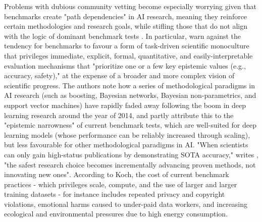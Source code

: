 Problems with dubious community vetting become especially worrying given that benchmarks create "path dependencies" in AI research, meaning they reinforce certain methodologies and research goals, while stifling those that do not align with the logic of dominant benchmark tests \cite{blili-hamelin2023}. %
In particular, \citet[p.~3]{koch2024} warn against the tendency for benchmarks to favour a form of task-driven scientific monoculture that privileges immediate, explicit, formal, quantitative, and easily-interpretable evaluation mechanisms that "prioritize one or a few key epistemic values (e.g., accuracy, safety)," at the expense of a broader and more complex vision of scientific progress. The authors note how a series of methodological paradigms in AI research (such as boosting, Bayesian networks, Bayesian non-parametrics, and support vector machines) have rapidly faded away following the boom in deep learning research around the year of 2014, and partly attribute this to the "epistemic narrowness" of current benchmark tests, which are well-suited for deep learning models (whose performance can be reliably increased through scaling), but less favourable for other methodological paradigms in AI. "When scientists can only gain high-status publications by demonstrating SOTA accuracy," writes \citet[p.~30]{koch2024}, "the safest research choice becomes incrementally advancing proven methods, not innovating new ones". According to Koch, the cost of current benchmark practices - which privileges scale, compute, and the use of larger and larger training datasets - for instance includes repeated privacy and copyright violations, emotional harms caused to under-paid data workers, and increasing ecological and environmental pressures due to high energy consumption. 


